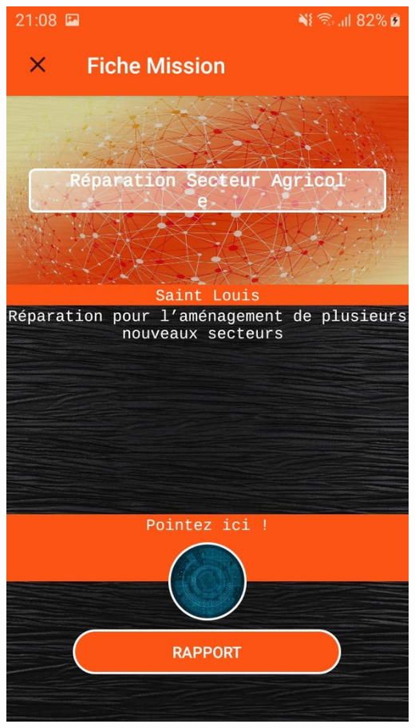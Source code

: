 \documentclass{article}
\begin{document}
\begin{center}
  \includegraphics[scale=0.15]{missionAnd.jpg}
\end{center}
\end{document}

